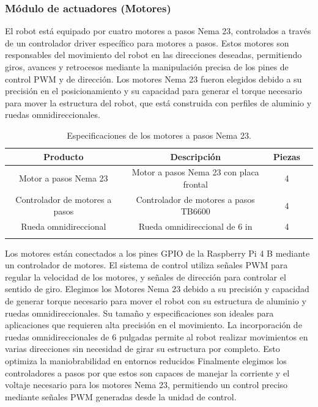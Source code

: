     \subsubsection{M\'odulo de actuadores (Motores)} %
    \label{ssub:modact}
    El robot est\'a equipado por cuatro motores a pasos Nema 23, controlados a trav\'es de
        un controlador driver espec\'ifico para motores a pasos. Estos motores son
        responsables del movimiento del robot en las direcciones deseadas, permitiendo giros,
        avances y retrocesos mediante la manipulaci\'on precisa de los pines de control PWM y
        de direcci\'on.
    \vskip 0.5cm
    Los motores Nema 23 fueron elegidos debido a su precisi\'on en el posicionamiento y
        su capacidad para generar el torque necesario para mover la estructura del robot, que
        est\'a construida con perfiles de aluminio y ruedas omnidireccionales.
    \vskip 0.5cm
    \begin{longtable}{|c|c|c|c|}
        \hline
        \rowcolor{gray}
        \textbf{Producto} & \textbf{Descripci\'on} & \textbf{Piezas} \\
        \hline
        Motor a pasos Nema 23 & Motor a pasos Nema 23 con placa frontal & 4  \\
        Controlador de motores a pasos & Controlador de motores a pasos TB6600 & 4  \\
        Rueda omnidireccional & Rueda omnidireccional de 6 in & 4  \\
        \hline
        \caption{Especificaciones de los motores a pasos Nema 23.}
        \label{tab:motor}
    \end{longtable}
    \vskip 0.5cm
    Los motores est\'an conectados a los pines GPIO de la Raspberry Pi 4 B mediante un
        controlador de motores. El sistema de control utiliza se\~nales PWM para regular la
        velocidad de los motores, y se\~nales de direcci\'on para controlar el sentido de giro.
    \vskip 0.5cm
    Elegimos los Motores Nema 23 debido a su precisi\'on y capacidad de generar torque
        necesario para mover el robot con su estructura de aluminio y ruedas
        omnidireccionales. Su tama\~no y especificaciones son ideales para aplicaciones que
        requieren alta precisi\'on en el movimiento.
    \vskip 0.5cm
    La incorporaci\'on de ruedas omnidireccionales de 6 pulgadas permite al robot realizar
        movimientos en varias direcciones sin necesidad de girar su estructura por completo.
        Esto optimiza la maniobrabilidad en entornos reducidos
    \vskip 0.5cm
    Finalmente elegimos los controladores a pasos por que estos son capaces de manejar
        la corriente y el voltaje necesario para los motores Nema 23, permitiendo un control
        preciso mediante se\~nales PWM generadas desde la unidad de control.
    \vskip 0.5cm
